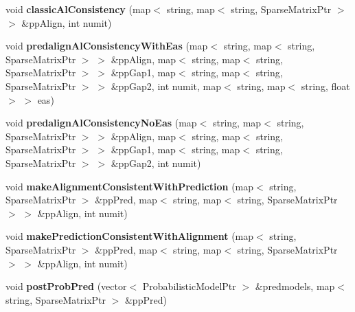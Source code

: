 \begin{DoxyCompactItemize}
\item 
\mbox{\label{classtops_1_1MultipleAlignment_a9839d365d80d5fc59e8ddc0531218e41}} 
void {\bfseries classic\+Al\+Consistency} (map$<$ string, map$<$ string, Sparse\+Matrix\+Ptr $>$ $>$ \&pp\+Align, int numit)
\item 
\mbox{\label{classtops_1_1MultipleAlignment_a8ad84b7721d24cc22de344e521a54079}} 
void {\bfseries predalign\+Al\+Consistency\+With\+Eas} (map$<$ string, map$<$ string, Sparse\+Matrix\+Ptr $>$ $>$ \&pp\+Align, map$<$ string, map$<$ string, Sparse\+Matrix\+Ptr $>$ $>$ \&pp\+Gap1, map$<$ string, map$<$ string, Sparse\+Matrix\+Ptr $>$ $>$ \&pp\+Gap2, int numit, map$<$ string, map$<$ string, float $>$ $>$ eas)
\item 
\mbox{\label{classtops_1_1MultipleAlignment_a7efe6ad0de153316c612d66b0db74384}} 
void {\bfseries predalign\+Al\+Consistency\+No\+Eas} (map$<$ string, map$<$ string, Sparse\+Matrix\+Ptr $>$ $>$ \&pp\+Align, map$<$ string, map$<$ string, Sparse\+Matrix\+Ptr $>$ $>$ \&pp\+Gap1, map$<$ string, map$<$ string, Sparse\+Matrix\+Ptr $>$ $>$ \&pp\+Gap2, int numit)
\item 
\mbox{\label{classtops_1_1MultipleAlignment_a166704d79b96ad5935642995f4740b8f}} 
void {\bfseries make\+Alignment\+Consistent\+With\+Prediction} (map$<$ string, Sparse\+Matrix\+Ptr $>$ \&pp\+Pred, map$<$ string, map$<$ string, Sparse\+Matrix\+Ptr $>$ $>$ \&pp\+Align, int numit)
\item 
\mbox{\label{classtops_1_1MultipleAlignment_ae4fce147af869d4db1465fe550de66b1}} 
void {\bfseries make\+Prediction\+Consistent\+With\+Alignment} (map$<$ string, Sparse\+Matrix\+Ptr $>$ \&pp\+Pred, map$<$ string, map$<$ string, Sparse\+Matrix\+Ptr $>$ $>$ \&pp\+Align, int numit)
\item 
\mbox{\label{classtops_1_1MultipleAlignment_a7f7878a5bcad01a61798a8b70232d48a}} 
void {\bfseries post\+Prob\+Pred} (vector$<$ Probabilistic\+Model\+Ptr $>$ \&predmodels, map$<$ string, Sparse\+Matrix\+Ptr $>$ \&pp\+Pred)
\item 
\mbox{\label{classtops_1_1MultipleAlignment_a3a9a92df5d13c52df581b3ccc4d69cee}} 

\end{DoxyCompactItemize}
